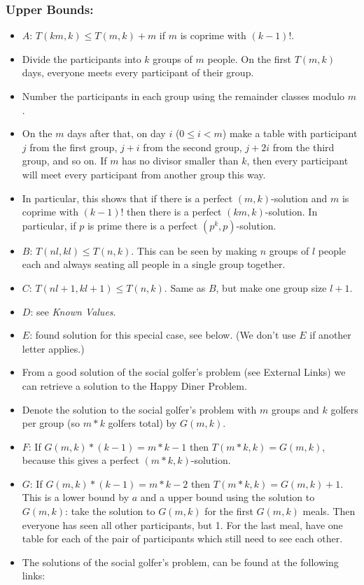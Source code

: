 \documentclass[a4paper]{article}
\begin{document}
\subsubsection{Upper Bounds:}\label{upper-bounds}

\begin{itemize}
\item
  $A$: $T(km,k)\leq T(m,k)+m$ if $m$ is coprime
  with $(k-1)!$.
\item
  Divide the participants into $k$ groups of $m$ people.
  On the first $T(m,k)$ days, everyone meets every participant of
  their group.
\item
  Number the participants in each group using the remainder classes
  modulo $m$.
\item
  On the $m$ days after that, on day $i$
  ($0\leq i<m$) make a table with participant $j$
  from the first group, $j+i$ from the second group,
  $j+2i$ from the third group, and so on. If $m$ has no
  divisor smaller than $k$, then every participant will meet
  every participant from another group this way.
\item
  In particular, this shows that if there is a perfect
  $(m,k)$-solution and $m$ is coprime with $(k-1)!$
  then there is a perfect $(km,k)$-solution. In particular, if
  $p$ is prime there is a perfect $(p^k,p)$-solution.
\item
  $B$: $T(nl,kl)\leq T(n,k)$. This can be seen by making
  $n$ groups of $l$ people each and always seating all
  people in a single group together.
\item
  $C$: $T(nl+1,kl+1)\leq T(n,k)$. Same as $B$, but
  make one group size $l+1$.
\item
  $D$: see \emph{Known Values}.
\item
  $E$: found solution for this special case, see below. (We don't
  use $E$ if another letter applies.)
\item
  From a good solution of the social golfer's problem (see External
  Links) we can retrieve a solution to the Happy Diner Problem.
\item
  Denote the solution to the social golfer's problem with $m$
  groups and $k$ golfers per group (so $m*k$ golfers
  total) by $G(m,k)$.
\item
  $F$: If $G(m,k)*(k-1)=m*k-1$ then
  $T(m*k,k)=G(m,k)$, because this gives a perfect
  $(m*k,k)$-solution.
\item
  $G$: If $G(m,k)*(k-1)=m*k-2$ then
  $T(m*k,k)=G(m,k)+1$. This is a lower bound by
  $a$ and a upper bound using the solution to $G(m,k)$:
  take the solution to $G(m,k)$ for the first $G(m,k)$
  meals. Then everyone has seen all other participants, but 1. For the
  last meal, have one table for each of the pair of participants which
  still need to see each other.
\item
  The solutions of the social golfer's problem, can be found at the
  following links:


\end{itemize}
\end{document}
